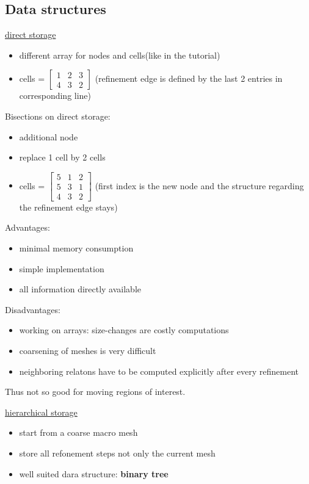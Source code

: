 \subsection{Data structures}
\underline{direct storage}
\begin{itemize}
	\item different array for nodes and cells(like in the tutorial)
	
	\item cells = 
	$\begin{bmatrix}
		1 & 2 & 3\\
		4 & 3 & 2
	\end{bmatrix} $ (refinement edge is defined by the last 2 entries in corresponding line)
	
\end{itemize}
Bisections on direct storage:
\begin{itemize}
	\item additional node
	\item replace 1 cell by 2 cells
	
	\item cells = 
	$\begin{bmatrix}
	5 & 1 & 2\\
	5 & 3 & 1\\
	4 & 3 & 2
	\end{bmatrix} $ (first index is the new node and the structure regarding the refinement edge stays)
	
\end{itemize}

Advantages:
\begin{itemize}
	\item minimal memory consumption
	\item simple implementation
	\item all information directly available
\end{itemize}

Disadvantages:
\begin{itemize}
	\item working on arrays: size-changes are costly computations
	\item coarsening of meshes is very difficult
	\item neighboring relatons have to be computed explicitly after every refinement
\end{itemize}
Thus not so good for moving regions of interest.
\vspace{1cm}

\underline{hierarchical storage}
\begin{itemize}
	\item start from a coarse \glqq macro mesh \grqq
	\item store all refonement steps not only the current mesh
	\item well suited dara structure: \textbf{binary tree}
\end{itemize}

